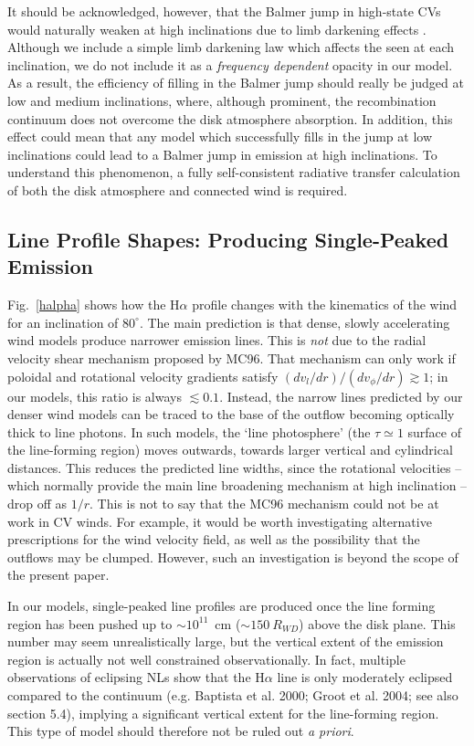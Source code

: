 \documentclass[preprint, a4paper, 11pt]{aastex}
\begin{document}
It should be acknowledged, however,
that the Balmer jump in high-state CVs would naturally weaken at
high inclinations due to limb darkening effects \citep{ladous1989, ladous1989b}. 
Although we include a simple limb darkening law which affects 
the seen at each inclination, we do not
include it as a {\em frequency dependent} opacity in our model.
As a result, the efficiency of filling in the Balmer jump
should really be judged at low and medium inclinations, 
where, although prominent, the recombination continuum does
not overcome the disk atmosphere absorption. 
In addition, this effect 
could mean that any model which successfully fills in the 
jump at low inclinations could lead to a Balmer jump 
in emission at high inclinations.
To understand this phenomenon, a fully self-consistent
radiative transfer calculation of both the disk atmosphere
and connected wind is required.


\subsection{Line Profile Shapes: Producing Single-Peaked Emission}

Fig.~\ref{halpha} shows how the H$\alpha$ profile changes with the kinematics of the wind for 
an inclination of $80^\circ$. The main prediction is that dense, slowly accelerating 
wind models produce narrower emission lines. This is {\em not} due to the radial 
velocity shear mechanism proposed by MC96. That mechanism can only work if poloidal 
and rotational velocity gradients satisfy $(dv_l/dr)/(dv_\phi/dr) \gtrsim 1$; in 
our models, this ratio is always $\lesssim 0.1$. Instead, the narrow lines predicted 
by our denser wind models can be traced to the base of the outflow becoming optically 
thick to line photons. In such models, the `line photosphere'
(the $\tau \simeq 1$ surface of the line-forming region) moves outwards, towards larger 
vertical and cylindrical distances. This reduces the predicted line widths, since the 
rotational velocities -- which normally provide the main line broadening mechanism at 
high inclination -- drop off as $1/r$. This is not to say that the MC96 
mechanism could not be at work in CV winds. For example, it would be worth investigating
alternative prescriptions for the wind velocity field, as well as the possibility that the 
outflows may be clumped. However, such an investigation is beyond the scope of the present paper.

In our models, single-peaked line profiles are produced once the line forming region has been
pushed up to $\sim 10^{11}$~cm ($\sim150~R_{WD}$) above the disk plane. 
This number may seem unrealistically large, but the vertical extent of 
the emission region is actually not well constrained observationally. 
In fact, multiple observations of eclipsing NLs show that the H$\alpha$ 
line is only moderately eclipsed compared to the continuum (e.g. Baptista et al. 2000;
Groot et al. 2004; see also section 5.4), 
implying a significant vertical extent for the line-forming 
region. This type of model should therefore not be ruled out {\em a priori}. 
\end{document}
